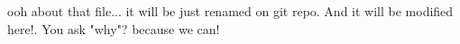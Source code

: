 ooh
about that file...
it will be just renamed on git repo.
And it will be modified here!.
You ask "why"?
because we can!
